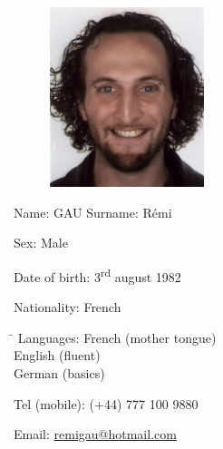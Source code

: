 \documentclass[a4paper,12pt,oneside]{letter}
\date{2011-04-12}
\begin{document}
\begin{figure}
\includegraphics[width=4.5cm]{ID0.jpg}
\end{figure}

Name: GAU \hspace{1cm} Surname: Rémi \hfill

Sex: Male

Date of birth: 3\textsuperscript{rd} august 1982

Nationality: French

\begin{tabbing}
\hspace{3cm}\=\kill
Languages:
 \> French (mother tongue)\\ 
 \> English (fluent)\\ 
 \> German (basics)\\ 
\end{tabbing}

{Tel (mobile):} (+44) 777 100 9880

{Email:} \href{mailto:remi\textunderscore gau@hotmail.com}{remi\textunderscore gau@hotmail.com}


% 
\end{document}
